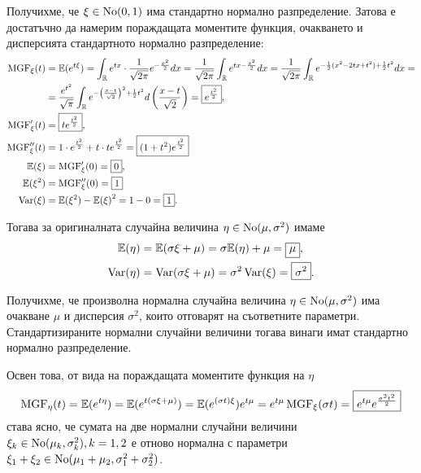 \documentclass[numbers=endperiod, DIV=15, bibliography=totocnumbered]{scrartcl}
\begin{document}
Получихме, че $\xi \in \operatorname{No}(0, 1)$ има стандартно нормално разпределение. Затова е достатъчно да намерим пораждащата моментите функция, очакването и дисперсията стандартното нормално разпределение:
\begingroup
\allowdisplaybreaks
\begin{align*}
  \operatorname{MGF}_\xi(t)
  &=
  \mathbb{E}(e^{t\xi})
  =
  \int_{\mathbb{R}} e^{tx} \cdot \frac 1 {\sqrt{2\pi}} e^{-\frac {x^2} 2} dx
  =
  \frac 1 {\sqrt{2\pi}} \int_{\mathbb{R}} e^{tx -\frac {x^2} 2} dx
  =
  \frac 1 {\sqrt{2\pi}} \int_{\mathbb{R}} e^{- \frac 1 2 (x^2 - 2tx + t^2) + \frac 1 2 t^2} dx
  = \\ &=
  \frac {e^{t^2}} {\sqrt \pi} \int_{\mathbb{R}} e^{- {\left(\frac {x - t} {\sqrt 2} \right)}^2 + \frac 1 2 t^2} d\left( \frac {x - t} {\sqrt 2} \right)
  =
  \boxed{e^{\frac {t^2} 2}},
  \\
  \operatorname{MGF}'_\xi(t)
  &=
  \boxed{t e^{\frac {t^2} 2}},
  \\
  \operatorname{MGF}''_\xi(t)
  &=
  1 \cdot e^{\frac {t^2} 2} + t \cdot t e^{\frac {t^2} 2}
  =
  \boxed{(1 + t^2) e^{\frac {t^2} 2}}
  \\
  \mathbb{E}(\xi)
  &=
  \operatorname{MGF}'_\xi(0)
  =
  \boxed{0},
  \\
  \mathbb{E}(\xi^2)
  &=
  \operatorname{MGF}''_\xi(0)
  =
  \boxed{1}
  \\
  \operatorname{Var}(\xi)
  &=
  \mathbb{E}(\xi^2) - {\mathbb{E}(\xi)}^2
  =
  1 - 0
  =
  \boxed{1}.
\end{align*}
\endgroup

Тогава за оригиналната случайна величина $\eta \in \operatorname{No}(\mu, \sigma^2)$ имаме
\begin{align*}
  \mathbb{E}(\eta) &= \mathbb{E}(\sigma \xi + \mu) = \sigma \mathbb{E}(\eta) + \mu = \boxed{\mu}, \\
  \operatorname{Var}(\eta) &= \operatorname{Var}(\sigma \xi + \mu) = \sigma^2 \operatorname{Var}(\xi) = \boxed{\sigma^2}.
\end{align*}

Получихме, че произволна нормална случайна величина $\eta \in \operatorname{No}(\mu, \sigma^2)$ има очакване $\mu$ и дисперсия $\sigma^2$, които отговарят на съответните параметри. Стандартизираните нормални случайни величини тогава винаги имат стандартно нормално разпределение.

Освен това, от вида на пораждащата моментите функция на $\eta$
\begin{displaymath}
  \operatorname{MGF}_\eta(t)
  =
  \mathbb{E}(e^{t\eta})
  =
  \mathbb{E}(e^{t(\sigma\xi + \mu)})
  =
  \mathbb{E}(e^{(\sigma t) \xi}) e^{t\mu}
  =
  e^{t\mu} \operatorname{MGF}_\xi(\sigma t)
  =
  \boxed{e^{t\mu} e^{\frac {\sigma^2 t^2} 2}}
\end{displaymath}
става ясно, че сумата на две нормални случайни величини $\xi_k \in \operatorname{No}(\mu_k, \sigma_k^2), k = 1, 2$ е отново нормална с параметри $\xi_1 + \xi_2 \in \operatorname{No}(\mu_1 + \mu_2, \sigma_1^2 + \sigma_2^2)$.
\end{document}

